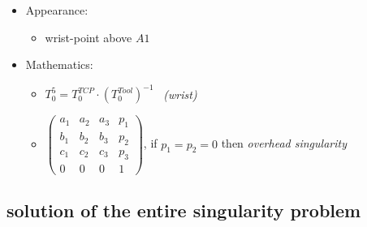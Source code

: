 \documentclass[professionalfonts, 
               xcolor={ usenames, %
                        dvipsnames,%
                        svgnames,%
                        table,%
                        hyperref%
                      }
              ]{beamer}
\begin{document}
\begin{frame}
\begin{itemize}
\item Appearance:
  \begin{itemize}
  \item wrist-point above $A1$
  \end{itemize}
\item Mathematics:
  \begin{itemize}
  \item $T_{0}^{5} = T_{0}^{TCP} \cdot (T_{0}^{Tool})^{-1}$ ~\footnotesize\textit{(wrist)} 
  \item           
  $\begin{pmatrix}
  a_1 & a_2 & a_3 & p_1 \\
  b_1 & b_2 & b_3 & p_2 \\
  c_1 & c_2 & c_3 & p_3 \\
  0   & 0   & 0   & 1 
  \end{pmatrix}$, 
  if $p_1 = p_2 = 0$ then \emph{overhead singularity}
  \end{itemize}
\end{itemize}  
\end{frame}

\begin{frame}[fragile]

\end{frame}

\subsection{solution of the entire singularity problem}
\begin{frame}[fragile]

\end{frame}

\end{document}
